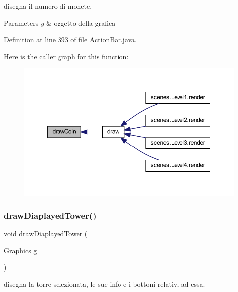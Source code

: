 disegna il numero di monete. 


\begin{DoxyParams}{Parameters}
{\em g} & oggetto della grafica \\
\hline
\end{DoxyParams}


Definition at line 393 of file Action\+Bar.\+java.

Here is the caller graph for this function\+:\nopagebreak
\begin{figure}[H]
\begin{center}
\leavevmode
\includegraphics[width=350pt]{classui_1_1_action_bar_ae07c200235fb700738b8194a93dbb8fb_icgraph}
\end{center}
\end{figure}
\mbox{\label{classui_1_1_action_bar_a2177b06de4c0084e953665a7dbfd6772}} 
\subsubsection{\texorpdfstring{draw\+Diaplayed\+Tower()}{drawDiaplayedTower()}}
{\footnotesize\ttfamily void draw\+Diaplayed\+Tower (\begin{DoxyParamCaption}\item[{Graphics}]{g }\end{DoxyParamCaption})\hspace{0.3cm}{\ttfamily [private]}}



disegna la torre selezionata, le sue info e i bottoni relativi ad essa. 


